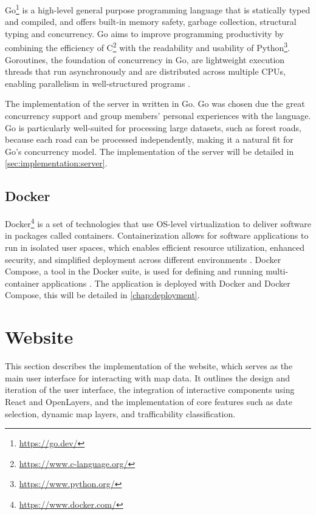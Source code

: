 Go\footnote{\url{https://go.dev/}} is a high-level general purpose programming language that is statically typed and compiled, and offers built-in memory safety, garbage collection, structural typing and concurrency. Go aims to improve programming productivity by combining the efficiency of C\footnote{\url{https://www.c-language.org/}} with the readability and usability of Python\footnote{\url{https://www.python.org/}}. Goroutines, the foundation of concurrency in Go, are lightweight execution threads that run asynchronously and are distributed across multiple CPUs, enabling parallelism in well-structured programs \cite{goproglanguage}.

The implementation of the server in written in Go. Go was chosen due the great concurrency support and group members' personal experiences with the language. Go is particularly well-suited for processing large datasets, such as forest roads, because each road can be processed independently, making it a natural fit for Go’s concurrency model. The implementation of the server will be detailed in \autoref{sec:implementation:server}.

\subsection{Docker}

Docker\footnote{\url{https://www.docker.com/}} is a set of technologies that use OS-level virtualization to deliver software in packages called containers. Containerization allows for software applications to run in isolated user spaces, which enables efficient resource utilization, enhanced security, and simplified deployment across different environments \cite{containerizationwikipedia}\cite{dockerwikipedia}. Docker Compose, a tool in the Docker suite, is used for defining and running multi-container applications \cite{dockercomposedocs}. The application is deployed with Docker and Docker Compose, this will be detailed in \autoref{chap:deployment}.

\section{Website}

This section describes the implementation of the website, which serves as the main user interface for interacting with map data. It outlines the design and iteration of the user interface, the integration of interactive components using React and OpenLayers, and the implementation of core features such as date selection, dynamic map layers, and trafficability classification.


